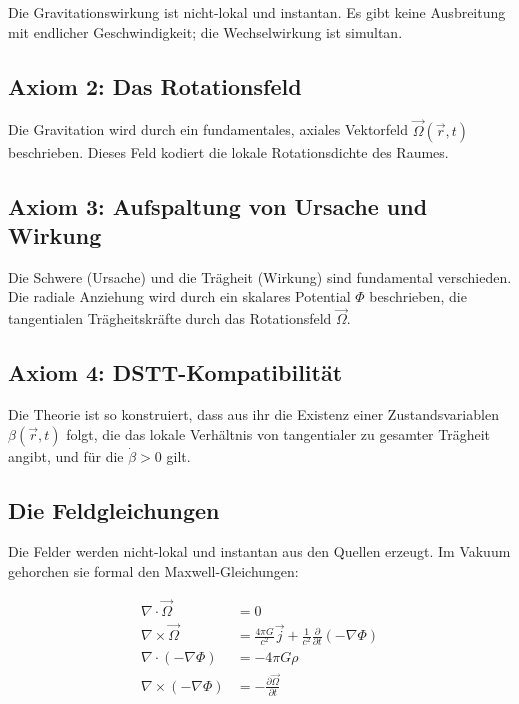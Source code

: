Die Gravitationswirkung ist nicht-lokal und instantan. Es gibt keine Ausbreitung mit endlicher Geschwindigkeit; die Wechselwirkung ist simultan.

\subsection{Axiom 2: Das Rotationsfeld}

Die Gravitation wird durch ein fundamentales, axiales Vektorfeld \( \vec{\Omega}(\vec{r}, t) \) beschrieben. Dieses Feld kodiert die lokale Rotationsdichte des Raumes.

\subsection{Axiom 3: Aufspaltung von Ursache und Wirkung}

Die Schwere (Ursache) und die Trägheit (Wirkung) sind fundamental verschieden. Die radiale Anziehung wird durch ein skalares Potential \( \Phi \) beschrieben, die tangentialen Trägheitskräfte durch das Rotationsfeld \( \vec{\Omega} \).

\subsection{Axiom 4: DSTT-Kompatibilität}

Die Theorie ist so konstruiert, dass aus ihr die Existenz einer Zustandsvariablen \( \beta(\vec{r}, t) \) folgt, die das lokale Verhältnis von tangentialer zu gesamter Trägheit angibt, und für die \( \dot{\beta} > 0 \) gilt.

\subsection{Die Feldgleichungen}

Die Felder werden nicht-lokal und instantan aus den Quellen erzeugt. Im Vakuum gehorchen sie formal den Maxwell-Gleichungen:

\[
\begin{aligned}
\nabla \cdot \vec{\Omega} &= 0 \\
\nabla \times \vec{\Omega} &= \frac{4\pi G}{c^2} \vec{j} + \frac{1}{c^2} \frac{\partial}{\partial t} (-\nabla \Phi) \\
\nabla \cdot (-\nabla \Phi) &= -4\pi G \rho \\
\nabla \times (-\nabla \Phi) &= -\frac{\partial \vec{\Omega}}{\partial t}
\end{aligned}
\]


